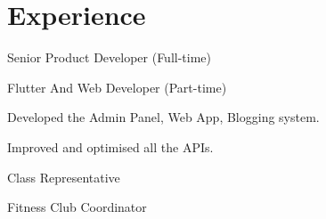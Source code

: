 \documentclass[]{deedy-resume-openfont}
\begin{document}
\begin{minipage}[t]{0.55\textwidth} 


\section{Experience}
\vspace{\topsep}
\vspace{\topsep}

\begin{tightemize}
\item Senior Product Developer (Full-time)
\end{tightemize}
\hspace{\topsep}

\begin{tightemize}
\item Flutter And Web Developer (Part-time)
\end{tightemize}
\hspace{\topsep}

\vspace{\topsep} %
\begin{tightemize}
\item Developed the Admin Panel, Web App, Blogging system.
\item Improved and optimised all the APIs.
\end{tightemize}
\sectionsep

\sectionsep

\sectionsep


\begin{tightemize}
\item Class Representative
\end{tightemize}
\hspace{\topsep}

\begin{tightemize}
\item Fitness Club Coordinator
\end{tightemize}
\hspace{\topsep}


\end{minipage}
\end{document}
